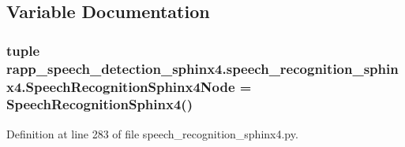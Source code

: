 \subsection{Variable Documentation}
\hypertarget{namespacerapp__speech__detection__sphinx4_1_1speech__recognition__sphinx4_a1f7be52b8e1565fce0c39407a1d72775}{
\subsubsection[{Speech\-Recognition\-Sphinx4\-Node}]{\setlength{\rightskip}{0pt plus 5cm}tuple rapp\-\_\-speech\-\_\-detection\-\_\-sphinx4.\-speech\-\_\-recognition\-\_\-sphinx4.\-Speech\-Recognition\-Sphinx4\-Node = {\bf Speech\-Recognition\-Sphinx4}()}}\label{namespacerapp__speech__detection__sphinx4_1_1speech__recognition__sphinx4_a1f7be52b8e1565fce0c39407a1d72775}


Definition at line 283 of file speech\-\_\-recognition\-\_\-sphinx4.\-py.

